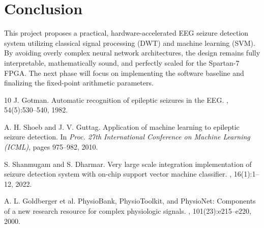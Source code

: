 \documentclass[10pt,twocolumn,letterpaper]{article}
\begin{document}
\section{Conclusion}
This project proposes a practical, hardware-accelerated EEG seizure detection system utilizing classical signal processing (DWT) and machine learning (SVM). By avoiding overly complex neural network architectures, the design remains fully interpretable, mathematically sound, and perfectly scaled for the Spartan-7 FPGA. The next phase will focus on implementing the software baseline and finalizing the fixed-point arithmetic parameters.

{\small

\begin{thebibliography}{10}\itemsep=-1pt
J. Gotman.
\newblock Automatic recognition of epileptic seizures in the EEG.
, 54(5):530--540, 1982.

A. H. Shoeb and J. V. Guttag.
\newblock Application of machine learning to epileptic seizure detection.
\newblock In {\em Proc. 27th International Conference on Machine Learning (ICML)}, pages 975--982, 2010.

S. Shanmugam and S. Dharmar.
\newblock Very large scale integration implementation of seizure detection system with on-chip support vector machine classifier.
, 16(1):1--12, 2022.

A. L. Goldberger et al.
\newblock PhysioBank, PhysioToolkit, and PhysioNet: Components of a new research resource for complex physiologic signals.
, 101(23):e215--e220, 2000.
\end{thebibliography}
}
\end{document}
